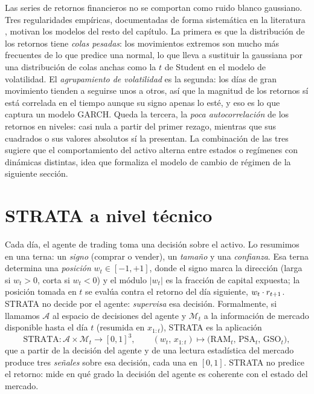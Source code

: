 Las series de retornos financieros no se comportan como ruido blanco gaussiano. Tres regularidades empíricas, documentadas de forma sistemática en la literatura \cite{cont2001}, motivan los modelos del resto del capítulo. La primera es que la distribución de los retornos tiene \emph{colas pesadas}: los movimientos extremos son mucho más frecuentes de lo que predice una normal, lo que lleva a sustituir la gaussiana por una distribución de colas anchas como la $t$ de Student en el modelo de volatilidad. El \emph{agrupamiento de volatilidad} es la segunda: los días de gran movimiento tienden a seguirse unos a otros, así que la magnitud de los retornos sí está correlada en el tiempo aunque su signo apenas lo esté, y eso es lo que captura un modelo GARCH. Queda la tercera, la \emph{poca autocorrelación} de los retornos en niveles: casi nula a partir del primer rezago, mientras que sus cuadrados o sus valores absolutos sí la presentan. La combinación de las tres sugiere que el comportamiento del activo alterna entre estados o regímenes con dinámicas distintas, idea que formaliza el modelo de cambio de régimen de la siguiente sección.

\section{STRATA a nivel técnico}
\label{sec:strata-tecnico}

Cada día, el agente de trading toma una decisión sobre el activo. Lo resumimos en una terna: un \emph{signo} (comprar o vender), un \emph{tamaño} y una \emph{confianza}. Esa terna determina una \emph{posición} $w_t \in [-1, +1]$, donde el signo marca la dirección (larga si $w_t > 0$, corta si $w_t < 0$) y el módulo $|w_t|$ es la fracción de capital expuesta; la posición tomada en $t$ se evalúa contra el retorno del día siguiente, $w_t \cdot r_{t+1}$. STRATA no decide por el agente: \emph{supervisa} esa decisión. Formalmente, si llamamos $\mathcal{A}$ al espacio de decisiones del agente y $\mathcal{M}_t$ a la información de mercado disponible hasta el día $t$ (resumida en $x_{1:t}$), STRATA es la aplicación
\[
\mathrm{STRATA}\colon \mathcal{A} \times \mathcal{M}_t \longrightarrow [0,1]^3,
\qquad
(w_t,\, x_{1:t}) \longmapsto \big(\mathrm{RAM}_t,\, \mathrm{PSA}_t,\, \mathrm{GSO}_t\big),
\]
que a partir de la decisión del agente y de una lectura estadística del mercado produce tres \emph{señales} sobre esa decisión, cada una en $[0,1]$. STRATA no predice el retorno: mide en qué grado la decisión del agente es coherente con el estado del mercado.

